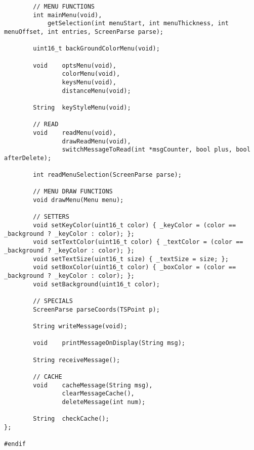 \documentclass[a4paper, 11pt]{scrartcl}
\begin{document}
\begin{lstlisting}
        // MENU FUNCTIONS
        int mainMenu(void),
            getSelection(int menuStart, int menuThickness, int menuOffset, int entries, ScreenParse parse);
        
        uint16_t backGroundColorMenu(void);
        
        void    optsMenu(void),
                colorMenu(void),
                keysMenu(void),
                distanceMenu(void);

        String  keyStyleMenu(void);

        // READ
        void    readMenu(void),
                drawReadMenu(void),
                switchMessageToRead(int *msgCounter, bool plus, bool afterDelete);

        int readMenuSelection(ScreenParse parse);

        // MENU DRAW FUNCTIONS
        void drawMenu(Menu menu);

        // SETTERS
        void setKeyColor(uint16_t color) { _keyColor = (color == _background ? _keyColor : color); };
        void setTextColor(uint16_t color) { _textColor = (color == _background ? _keyColor : color); };
        void setTextSize(uint16_t size) { _textSize = size; };
        void setBoxColor(uint16_t color) { _boxColor = (color == _background ? _keyColor : color); };
        void setBackground(uint16_t color);

        // SPECIALS
        ScreenParse parseCoords(TSPoint p);
        
        String writeMessage(void);
        
        void    printMessageOnDisplay(String msg);
        
        String receiveMessage();

        // CACHE
        void    cacheMessage(String msg),
                clearMessageCache(),
                deleteMessage(int num);
        
        String  checkCache();
};

#endif
\end{lstlisting}
\end{document}
